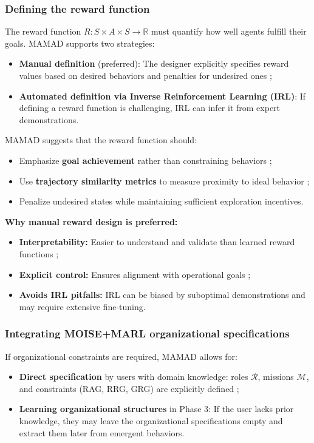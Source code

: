 \documentclass[pdflatex,sn-mathphys-num]{sn-jnl}%
\theoremstyle{thmstyleone}%
\theoremstyle{thmstyletwo}%
\theoremstyle{thmstylethree}%
\begin{document}
\subsubsection{Defining the reward function}
The reward function $R: S \times A \times S \to \mathbb{R}$ must quantify how well agents fulfill their goals. MAMAD supports two strategies:
\begin{itemize}
    \item \textbf{Manual definition} (preferred): The designer explicitly specifies reward values based on desired behaviors and penalties for undesired ones ;
    \item \textbf{Automated definition via Inverse Reinforcement Learning (IRL)}: If defining a reward function is challenging, IRL can infer it from expert demonstrations.
\end{itemize}

MAMAD suggests that the reward function should:
\begin{itemize}
    \item Emphasize \textbf{goal achievement} rather than constraining behaviors ;
    \item Use \textbf{trajectory similarity metrics} to measure proximity to ideal behavior ;
    \item Penalize undesired states while maintaining sufficient exploration incentives.
\end{itemize}

\noindent \textbf{Why manual reward design is preferred:}
\begin{itemize}
    \item \textbf{Interpretability:} Easier to understand and validate than learned reward functions ;
    \item \textbf{Explicit control:} Ensures alignment with operational goals ;
    \item \textbf{Avoids IRL pitfalls:} IRL can be biased by suboptimal demonstrations and may require extensive fine-tuning.
\end{itemize}

\subsubsection{Integrating MOISE+MARL organizational specifications}
If organizational constraints are required, MAMAD allows for:
\begin{itemize}
    \item \textbf{Direct specification} by users with domain knowledge: roles $\mathcal{R}$, missions $\mathcal{M}$, and constraints (RAG, RRG, GRG) are explicitly defined ;
    \item \textbf{Learning organizational structures} in Phase 3: If the user lacks prior knowledge, they may leave the organizational specifications empty and extract them later from emergent behaviors.
\end{itemize}
\end{document}
